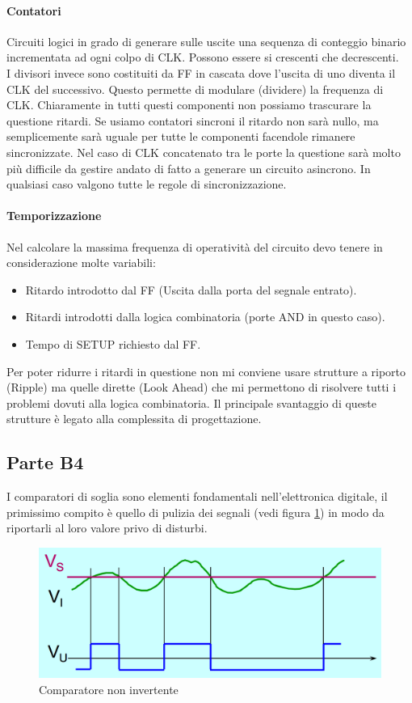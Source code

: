 \documentclass[12pt]{article}
\begin{document}
\paragraph{Contatori} Circuiti logici in grado di generare sulle uscite una sequenza di conteggio binario incrementata ad ogni colpo di CLK. Possono essere si crescenti che decrescenti.\\
I divisori invece sono costituiti da FF in cascata dove l'uscita di uno diventa il CLK del successivo. Questo permette di modulare (dividere) la frequenza di CLK. Chiaramente in tutti questi componenti non possiamo trascurare la questione ritardi. Se usiamo contatori sincroni il ritardo non sarà nullo, ma semplicemente sarà uguale per tutte le componenti facendole rimanere sincronizzate. Nel caso di CLK concatenato tra le porte la questione sarà molto più difficile da gestire andato di fatto a generare un circuito asincrono. In qualsiasi caso valgono tutte le regole di sincronizzazione.

\paragraph{Temporizzazione} Nel calcolare la massima frequenza di operatività del circuito devo tenere in considerazione molte variabili:
\begin{itemize}
  \item Ritardo introdotto dal FF (Uscita dalla porta del segnale entrato).
  \item Ritardi introdotti dalla logica combinatoria (porte AND in questo caso).
  \item Tempo di SETUP richiesto dal FF.
\end{itemize}
Per poter ridurre i ritardi in questione non mi conviene usare strutture a riporto (Ripple) ma quelle dirette (Look Ahead) che mi permettono di risolvere tutti i problemi dovuti alla logica combinatoria. Il principale svantaggio di queste strutture è legato alla complessita di progettazione.

\subsection{Parte B4}\label{b4}
I comparatori di soglia sono elementi fondamentali nell'elettronica digitale, il primissimo compito è quello di pulizia dei segnali (vedi figura \ref{fig:comparator}) in modo da riportarli al loro valore privo di disturbi.
\begin{figure}[!hp]
  \includegraphics[width=\textwidth]{images/comparator.png}
  \caption{Comparatore non invertente}
  \label{fig:comparator}
\end{figure}
\end{document}
